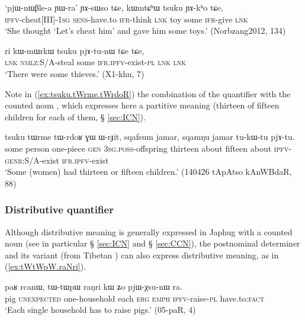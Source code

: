 \begin{exe}
\ex \label{ex:kWmtChW.tsuku}
\gll  `pjɯ-nɯβle-a ɲɯ-ra' ɲɤ-sɯso tɕe, kɯmtɕʰɯ tsuku ɲɤ-kʰo tɕe, \\
\textsc{ipfv}-cheat[III]-\textsc{1sg} \textsc{sens}-have.to \textsc{ifr}-think \textsc{lnk} toy some \textsc{ifr}-give \textsc{lnk} \\
\glt `She thought `Let's cheat him' and gave him some toys.' (Norbzang2012, 134)
\end{exe}

\begin{exe}
\ex \label{ex:kWmWrkW.tsuku}
\gll ri kɯ-mɯrkɯ tsuku pjɤ-tu-nɯ tɕe tɕe, \\
\textsc{lnk} \textsc{nmlz}:S/A-steal some \textsc{ifr}.\textsc{ipfv}-exist-\textsc{pl} \textsc{lnk} \textsc{lnk} \\
\glt `There were some thieves.' (X1-khu, 7)
\end{exe}

Note in (\ref{ex:tsuku.tWrme.tWrdoR}) the combination of the quantifier  with the counted noun , which expresses here a partitive meaning (thirteen of fifteen children for each of them, § \ref{sec:ICN}).

\begin{exe}
\ex \label{ex:tsuku.tWrme.tWrdoR}
\gll tsuku tɯrme tɯ-rdoʁ ɣɯ ɯ-rɟit, sqafsum jamar, sqamŋu jamar tu-kɯ-tu pjɤ-tu. \\
 some person one-piece \textsc{gen} \textsc{3sg}.\textsc{poss}-offspring thirteen about fifteen about \textsc{ipfv}-\textsc{genr}:S/A-exist \textsc{ifr}.\textsc{ipfv}-exist    \\
\glt  `Some (women) had thirteen or fifteen children.' (140426 tApAtso kAnWBdaR, 88)
\end{exe}
 
\subsubsection{Distributive quantifier} \label{sec:raNri}
 Although distributive meaning is generally expressed in Japhug with a counted noun (see in particular § \ref{sec:ICN} and § \ref{sec:CCN}), the postnominal determiner  and its variant  (from Tibetan ) can also express distributive meaning, as in (\ref{ex:tWtWpW.raNri}). 
 
\begin{exe}
\ex \label{ex:tWtWpW.raNri}
\gll paʁ rcanɯ, tɯ-tɯpɯ raŋri kɯ ʑo pjɯ-χsu-nɯ ra. \\
pig \textsc{unexpected} one-household each \textsc{erg} \textsc{emph} \textsc{ipfv}-raise-\textsc{pl} have.to:\textsc{fact} \\
 \glt `Each single household has to raise pigs.' (05-paR, 4)
 \end{exe}
 
